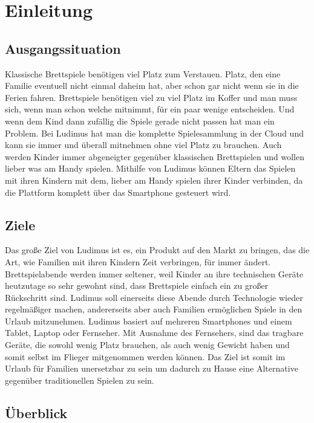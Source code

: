\chapter{Einleitung}
\section{Ausgangssituation}
Klassische Brettspiele benötigen viel Platz zum Verstauen. Platz, den eine Familie eventuell nicht einmal daheim hat, aber schon gar nicht wenn sie in die Ferien fahren. Brettspiele benötigen viel zu viel Platz im Koffer und man muss sich, wenn man schon welche mitnimmt, für ein paar wenige entscheiden. Und wenn dem Kind dann zufällig die Spiele gerade nicht passen hat man ein Problem. Bei Ludimus hat man die komplette Spielesammlung in der Cloud und kann sie immer und überall mitnehmen ohne viel Platz zu brauchen.
\newline 
Auch werden Kinder immer abgeneigter gegenüber klassischen Brettspielen und wollen lieber was am Handy spielen. Mithilfe von Ludimus können Eltern das Spielen mit ihren Kindern mit dem,  lieber am Handy spielen ihrer Kinder verbinden, da die Plattform komplett über das Smartphone gesteuert wird.

\section{Ziele}
Das große Ziel von Ludimus ist es, ein Produkt auf den Markt zu bringen, das die Art, wie Familien mit ihren Kindern Zeit verbringen, für immer ändert. Brettspielabende werden immer seltener, weil Kinder an ihre technischen Geräte heutzutage so sehr gewohnt sind, dass Brettspiele einfach ein zu großer Rückschritt sind. Ludimus soll einerseits diese Abende durch Technologie wieder regelmäßiger machen, andererseits aber auch Familien ermöglichen Spiele in den Urlaub mitzunehmen. Ludimus basiert auf mehreren Smartphones und einem Tablet, Laptop oder Fernseher. Mit Ausnahme des Fernsehers, sind das tragbare Geräte, die sowohl wenig Platz brauchen, als auch wenig Gewicht haben und somit selbst im Flieger mitgenommen werden können. 
Das Ziel ist somit im Urlaub für Familien unersetzbar zu sein um dadurch zu Hause eine Alternative gegenüber traditionellen Spielen zu sein.

\section{Überblick}

